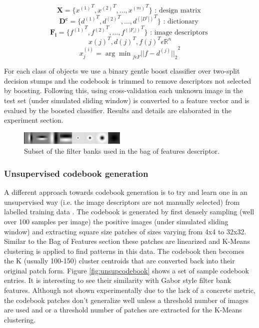 \documentclass[10pt,twocolumn,letterpaper]{article}
\begin{document}
\[\boldsymbol{X} = \{{x^{(1)}}^T,{x^{(2)}}^T,\ldots,{x^{(m)}}^T\} \text{ : design matrix } \]
\[\boldsymbol{D^c} = \{{d^{(1)}}^T,{d^{(2)}}^T,\ldots,{d^{(|D^c|)}}^T\} \text{ : dictionary } \]
\[\boldsymbol{F_i} = \{{f^{(1)}}^T,{f^{(2)}}^T,\ldots,{f^{(|F_i|)}}^T\} \text{ : image descriptors } \]
\[ x(j)^T , d(j)^T , f(j)^T  \epsilon \mathbb{R}^n \]
\begin{equation} 
    {x_j^{(i)}} = {\arg \min}_{f \epsilon F} {||f - {d}^{(j)}||_2}^2 
    \label{eq:fv_bw}
\end{equation}

For each class of objects we use a binary gentle boost classifier over two-split decision stumps and the codebook is trimmed
to remove descriptors not selected by boosting. 
Following this, using cross-validation each unknown image in the test set (under simulated sliding window) is converted to a feature vector and is evalued by the boosted classifier. Results and details are elaborated in the experiment section.

\begin{figure}[t]
\begin{center}
    \includegraphics[width=2.0in]{filter.jpg}
\end{center}
\caption{Subset of the filter banks used in the bag of features descriptor.}
\label{fig:filter}
\end{figure}

\subsubsection{Unsupervised codebook generation}

A different approach towards codebook generation is to try and learn one in an 
unsupervised way (i.e. the image descriptors are not manually selected) 
from labelled training data \cite{codebook1}.
The codebook is generated by first densely sampling (well over 100 samples per image) the positive images (under simulated sliding window) and extracting square size patches of sizes varying from 4x4 to 32x32. Similar to the Bag of Features section these patches are linearized and K-Means clustering is applied to find patterns in this data. The codebook then becomes the K (usually 100-150) cluster centroids that are converted back into their original patch form.
Figure \ref{fig:unsupcodebook} shows a set of sample codebook entries. It is interesting to see their similarity with 
Gabor style filter bank features. Although not shown experimentally due to the lack of a concrete metric,
the codebook patches don't generalize well unless a threshold number of images are used and or a threshold
number of patches are extracted for the K-Means clustering.
\end{document}
